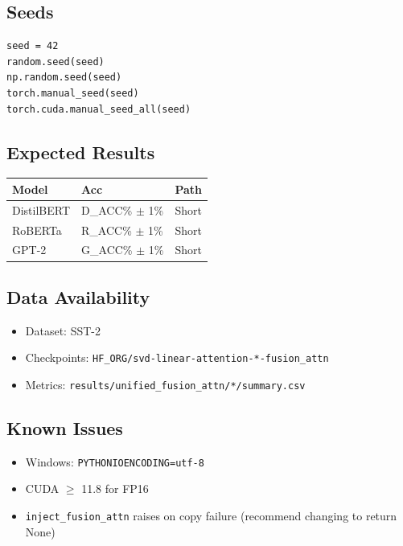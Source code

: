 \subsection{Seeds}

\begin{lstlisting}
seed = 42
random.seed(seed)
np.random.seed(seed)
torch.manual_seed(seed)
torch.cuda.manual_seed_all(seed)
\end{lstlisting}

\subsection{Expected Results}

\begin{table}[H]
\centering
\small
\begin{tabular}{lll}
\toprule
\textbf{Model} & \textbf{Acc} & \textbf{Path} \\
\midrule
DistilBERT & {{D\_ACC}}\% $\pm$ 1\% & Short \\
RoBERTa & {{R\_ACC}}\% $\pm$ 1\% & Short \\
GPT-2 & {{G\_ACC}}\% $\pm$ 1\% & Short \\
\bottomrule
\end{tabular}
\end{table}

\subsection{Data Availability}

\begin{itemize}
\item Dataset: SST-2
\item Checkpoints: \texttt{{{HF\_ORG}}/svd-linear-attention-*-fusion\_attn}
\item Metrics: \texttt{results/unified\_fusion\_attn/*/summary.csv}

\end{itemize}
\subsection{Known Issues}

\begin{itemize}
\item Windows: \texttt{PYTHONIOENCODING=utf-8}
\item CUDA $\ge$ 11.8 for FP16
\item \texttt{inject\_fusion\_attn} raises on copy failure (recommend changing to return None)

\end{itemize}
